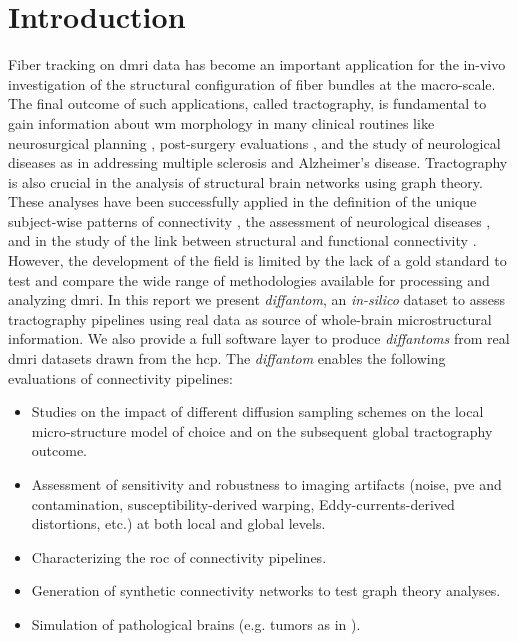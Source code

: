 \documentclass[english]{frontiers/frontiersSCNS} %
\newcommand*\glslines[2][]{\glslink[#1]{#2}{\glsdisp{#2}{\acrlong{#2} --\glsentryshort{#2}--}}}
\begin{document}
\section*{Introduction}
Fiber tracking on \gls*{dmri} data has become an important application for the in-vivo investigation
  of the structural configuration of fiber bundles at the macro-scale.
The final outcome of such applications, called tractography, is fundamental to gain information about
  \gls*{wm} morphology in many clinical routines like neurosurgical planning \citep{golby_interactive_2011},
  post-surgery evaluations \citep{toda_utility_2014},
  and the study of neurological diseases as in \citep{chua_diffusion_2008} addressing multiple sclerosis and
  Alzheimer's disease.
Tractography is also crucial in the analysis of structural brain networks using graph theory.
These analyses have been successfully applied in the definition of the unique subject-wise patterns of connectivity
  \citep{sporns_human_2005}, the assessment of neurological diseases \citep{griffa_structural_2013}, and in the
  study of the link between structural and functional connectivity \citep{messe_predicting_2015}.
However, the development of the field is limited by the lack of a gold standard to test and compare the
  wide range of methodologies available for processing and analyzing \gls*{dmri}.
In this report we present \emph{diffantom}, an \emph{in-silico} dataset to assess tractography pipelines using
  real data as source of whole-brain microstructural information.
We also provide a full software layer to produce \emph{diffantoms} from real \gls*{dmri} datasets
  drawn from the \gls*{hcp}.
The \emph{diffantom} enables the following evaluations of connectivity pipelines:
\begin{itemize}
  \item Studies on the impact of different diffusion sampling schemes on the local micro-structure
  model of choice and on the subsequent global tractography outcome.
  \item Assessment of sensitivity and robustness to imaging artifacts (noise, \acrlong{pve} and \glslines{csf} contamination,
    susceptibility-derived warping, Eddy-currents-derived distortions, etc.) at both local and global levels.
  \item Characterizing the \acrfull*{roc} of connectivity pipelines.
  \item Generation of synthetic connectivity networks to test graph theory analyses.
  \item Simulation of pathological brains (e.g. tumors as in \cite{kaus_simulation_2000}).
\end{itemize}
\end{document}
